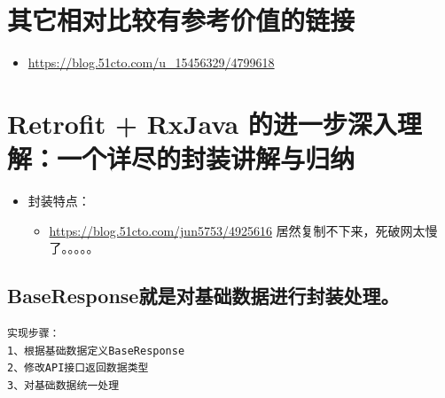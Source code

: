 \documentclass[9pt, b5paper]{article}
\begin{document}
\section{其它相对比较有参考价值的链接}
\label{sec-17}
\begin{itemize}
\item \url{https://blog.51cto.com/u_15456329/4799618}
\end{itemize}

\section{Retrofit + RxJava 的进一步深入理解：一个详尽的封装讲解与归纳}
\label{sec-18}
\begin{itemize}
\item 封装特点： 
\begin{itemize}
\item \url{https://blog.51cto.com/jun5753/4925616} 居然复制不下来，死破网太慢了。。。。。
\end{itemize}
\end{itemize}
\subsection{BaseResponse就是对基础数据进行封装处理。}
\label{sec-18-1}
\begin{verbatim}
实现步骤：
1、根据基础数据定义BaseResponse
2、修改API接口返回数据类型
3、对基础数据统一处理
\end{verbatim}
\end{document}
